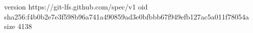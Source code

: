 version https://git-lfs.github.com/spec/v1
oid sha256:f4b0b2e7e3f598b96a741a490859ad3e0bfbbb67f949efb127ac5a011f78054a
size 4138
